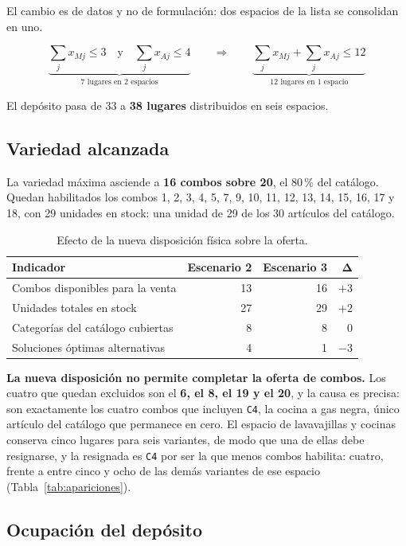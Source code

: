 \documentclass[10pt,a4paper]{article}
\newcommand{\art}[1]{\texttt{#1}}
\begin{document}
El cambio es de datos y no de formulación: dos espacios de la lista se
consolidan en uno.

\[
\underbrace{\sum_j x_{Mj} \leq 3 \quad\text{y}\quad \sum_j x_{Aj} \leq 4}_{\text{7 lugares en 2 espacios}}
\qquad\Longrightarrow\qquad
\underbrace{\sum_j x_{Mj} + \sum_j x_{Aj} \leq 12}_{\text{12 lugares en 1 espacio}}
\]

El depósito pasa de 33 a \textbf{38 lugares} distribuidos en seis espacios.

\subsection{Variedad alcanzada}

La variedad máxima asciende a \textbf{16 combos sobre 20}, el 80\,\% del
catálogo. Quedan habilitados los combos 1, 2, 3, 4, 5, 7, 9, 10, 11, 12, 13, 14,
15, 16, 17 y 18, con 29 unidades en stock: una unidad de 29 de los 30 artículos
del catálogo.

\begin{table}[H]
\centering\small
\caption{Efecto de la nueva disposición física sobre la oferta.}
\label{tab:comparacion_23}
\begin{tabular}{lrrr}
\toprule
\textbf{Indicador} & \textbf{Escenario 2} & \textbf{Escenario 3} & $\boldsymbol{\Delta}$ \\
\midrule
Combos disponibles para la venta  & 13 & 16 & $+3$ \\
Unidades totales en stock         & 27 & 29 & $+2$ \\
Categorías del catálogo cubiertas & 8  & 8  & 0 \\
Soluciones óptimas alternativas   & 4  & 1  & $-3$ \\
\bottomrule
\end{tabular}
\end{table}

\textbf{La nueva disposición no permite completar la oferta de combos.} Los
cuatro que quedan excluidos son el \textbf{6, el 8, el 19 y el 20}, y la causa
es precisa: son exactamente los cuatro combos que incluyen \art{C4}, la cocina a
gas negra, único artículo del catálogo que permanece en cero. El espacio de
lavavajillas y cocinas conserva cinco lugares para seis variantes, de modo que
una de ellas debe resignarse, y la resignada es \art{C4} por ser la que menos
combos habilita: cuatro, frente a entre cinco y ocho de las demás variantes de
ese espacio (Tabla~\ref{tab:apariciones}).

\subsection{Ocupación del depósito}
\end{document}
